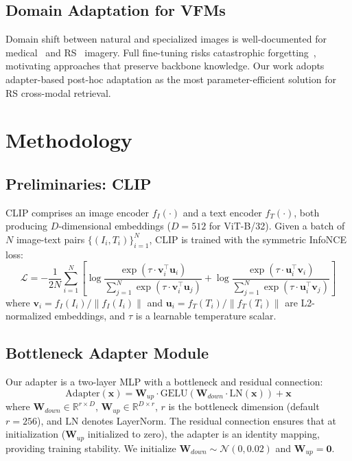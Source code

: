\documentclass[review,12pt]{elsarticle}
\begin{document}
\subsection{Domain Adaptation for VFMs}
Domain shift between natural and specialized images is well-documented for
medical~\cite{zhang2022medical} and RS~\cite{TP2024survey} imagery. Full
fine-tuning risks catastrophic forgetting~\cite{kirkpatrick2017ewc},
motivating approaches that preserve backbone knowledge. Our work adopts
adapter-based post-hoc adaptation as the most parameter-efficient solution
for RS cross-modal retrieval.

\section{Methodology}
\label{sec:method}

\subsection{Preliminaries: CLIP}
CLIP comprises an image encoder $f_I(\cdot)$ and a text encoder $f_T(\cdot)$,
both producing $D$-dimensional embeddings ($D=512$ for ViT-B/32). Given a
batch of $N$ image-text pairs $\{(I_i, T_i)\}_{i=1}^N$, CLIP is trained with
the symmetric InfoNCE loss:
\begin{equation}
\mathcal{L} = -\frac{1}{2N}\sum_{i=1}^{N}
\left[
  \log \frac{\exp(\tau \cdot \mathbf{v}_i^\top \mathbf{u}_i)}
            {\sum_{j=1}^N \exp(\tau \cdot \mathbf{v}_i^\top \mathbf{u}_j)}
+ \log \frac{\exp(\tau \cdot \mathbf{u}_i^\top \mathbf{v}_i)}
            {\sum_{j=1}^N \exp(\tau \cdot \mathbf{u}_i^\top \mathbf{v}_j)}
\right]
\label{eq:infonce}
\end{equation}
where $\mathbf{v}_i = f_I(I_i)/\|f_I(I_i)\|$ and $\mathbf{u}_i = f_T(T_i)/\|f_T(T_i)\|$
are L2-normalized embeddings, and $\tau$ is a learnable temperature scalar.

\subsection{Bottleneck Adapter Module}
Our adapter is a two-layer MLP with a bottleneck and residual connection:
\begin{equation}
\text{Adapter}(\mathbf{x}) = \mathbf{W}_{up} \cdot \text{GELU}\!\left(\mathbf{W}_{down} \cdot \text{LN}(\mathbf{x})\right) + \mathbf{x}
\label{eq:adapter}
\end{equation}
where $\mathbf{W}_{down} \in \mathbb{R}^{r \times D}$, $\mathbf{W}_{up} \in \mathbb{R}^{D \times r}$,
$r$ is the bottleneck dimension (default $r=256$), and $\text{LN}$ denotes
LayerNorm. The residual connection ensures that at initialization
($\mathbf{W}_{up}$ initialized to zero), the adapter is an identity mapping,
providing training stability. We initialize $\mathbf{W}_{down} \sim \mathcal{N}(0, 0.02)$
and $\mathbf{W}_{up} = \mathbf{0}$.
\end{document}
